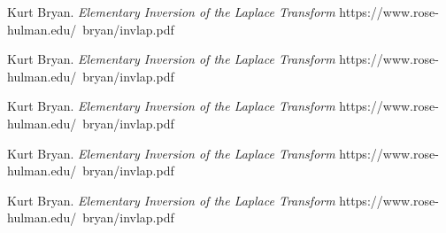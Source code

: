 \begin{thebibliography}{99}
 Kurt Bryan. {\it Elementary Inversion of the Laplace Transform} https://www.rose-hulman.edu/~bryan/invlap.pdf

 Kurt Bryan. {\it Elementary Inversion of the Laplace Transform} https://www.rose-hulman.edu/~bryan/invlap.pdf

 Kurt Bryan. {\it Elementary Inversion of the Laplace Transform} https://www.rose-hulman.edu/~bryan/invlap.pdf

 Kurt Bryan. {\it Elementary Inversion of the Laplace Transform} https://www.rose-hulman.edu/~bryan/invlap.pdf

 Kurt Bryan. {\it Elementary Inversion of the Laplace Transform} https://www.rose-hulman.edu/~bryan/invlap.pdf

\begin{comment}


\bibitem{PI} Post, E. {\it Generalized Differentiation}, Trans. Amer. Math. Soc. 32 (1930),
p. 723-781.

\bibitem{BB} G.I. Barenblatt, {\it Scaling, Self-Similarity and Intermediate Asymptotics},
Cambridge University Press, Cambridge, 1996.


\bibitem{GV} V.A. Galaktionov and J.L. V\'azquez, {\it A Stability Technique for Evolution Partial Differential 
Equations - A Dynamical Systems Approach}, Birkhauser, 2004.

\bibitem{NG} N. Goldenfeld, {\it Lectures on Phase Transitions and the Renormalization Group},
Addison-Wesley, 1992.

\bibitem{SGKM} A.A. Samarskii, V.A. Galaktionov, S.P. Kurdyumov and A.P. Mikhailov (M. Grinfeld translation), 
{\it Blow-up in Quasilinear Parabolic Equations}, Addison-Wesley, 1992.

\bibitem{ALM} L.M. Abia, J.C. L\'opez-Marcos and J. Mart\'\i nez, {\it The Euler method in the numerical
integration of reaction-diffusion problems with blow-up}, Appl. Num. Math., 38 (2001) 3, pp. 287-313.

\bibitem{AS} W.K. Abou Salem, {\it On the renormalization group approach to perturbation theory for PDEs},
Ann. Henri Poincar\'e, 11 (2010), pp. 1007-1021.

\bibitem{AAB} D.G. Aronson, S.B. Angenent and S.I. Betel\'u, {\it Renormalization study of 
two-dimensional convergent solutions of the porous medium equation}, Physica D, 138 (2000) Nos. 3-4, pp. 344-359.


\end{comment}
\end{thebibliography}
